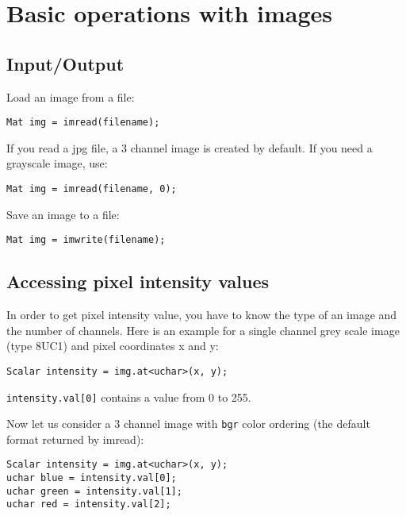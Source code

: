 \section{Basic operations with images}


\ifCpp
\subsection{Input/Output}
Load an image from a file:
\begin{lstlisting}
Mat img = imread(filename);
\end{lstlisting}

If you read a jpg file, a 3 channel image is created by default. If you need a grayscale image, use:
\begin{lstlisting}
Mat img = imread(filename, 0);
\end{lstlisting}

Save an image to a file:
\begin{lstlisting}
Mat img = imwrite(filename);
\end{lstlisting}

\subsection{Accessing pixel intensity values}

In order to get pixel intensity value, you have to know the type of an image and the number of channels. Here is an example for a single channel grey scale image (type 8UC1) and pixel coordinates x and y:
\begin{lstlisting}
Scalar intensity = img.at<uchar>(x, y);
\end{lstlisting}
\texttt{intensity.val[0]} contains a value from 0 to 255. 

Now let us consider a 3 channel image with \texttt{bgr} color ordering (the default format returned by imread):
\begin{lstlisting}
Scalar intensity = img.at<uchar>(x, y);
uchar blue = intensity.val[0];
uchar green = intensity.val[1];
uchar red = intensity.val[2];
\end{lstlisting}
\fi


